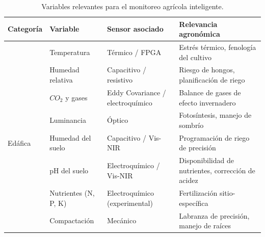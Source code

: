 \begin{table}[H]
      \centering
      \begin{tabularx}{\textwidth}{
            >{\raggedright\arraybackslash}p{2.2cm}
            >{\raggedright\arraybackslash}p{2.5cm}
            >{\raggedright\arraybackslash}p{3cm}
            >{\raggedright\arraybackslash}X}
            \toprule
            \textbf{Categoría} & \textbf{Variable}
                               & \textbf{Sensor asociado}
                               & \textbf{Relevancia agronómica}                     \\
            \midrule
            {Ambiental}
                               & Temperatura
                               & Térmico / FPGA
                               & Estrés térmico, fenología del cultivo              \\
                               & Humedad relativa
                               & Capacitivo / resistivo
                               & Riesgo de hongos, planificación de riego           \\
                               & \(CO_2\) y gases
                               & Eddy Covariance / electroquímico
                               & Balance de gases de efecto invernadero             \\
                               & Luminancia
                               & Óptico
                               & Fotosíntesis, manejo de sombrío                    \\
            \midrule
            {Edáfica}
                               & Humedad del suelo
                               & Capacitivo / Vis-NIR
                               & Programación de riego de precisión                 \\
                               & pH del suelo
                               & Electroquímico / Vis-NIR
                               & Disponibilidad de nutrientes, corrección de acidez \\
                               & Nutrientes (N, P, K)
                               & Electroquímico (experimental)
                               & Fertilización sitio-específica                     \\
                               & Compactación
                               & Mecánico
                               & Labranza de precisión, manejo de raíces            \\
            \bottomrule
      \end{tabularx}
      \caption{Variables relevantes para el monitoreo agrícola
            inteligente. \parencite{  rajak2023internet, pyingkodi2022sensor,alahmad2023applying}}
      \label{tab:variables_monitoreo}
\end{table}


